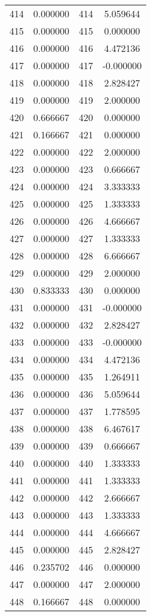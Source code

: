 \documentclass[12pt]{article}
\begin{document}
\begin{longtable}{@{}cccc@{}}
414 & 0.000000 & 414 & 5.059644 \\
415 & 0.000000 & 415 & 0.000000 \\
416 & 0.000000 & 416 & 4.472136 \\
417 & 0.000000 & 417 & -0.000000 \\
418 & 0.000000 & 418 & 2.828427 \\
419 & 0.000000 & 419 & 2.000000 \\
420 & 0.666667 & 420 & 0.000000 \\
421 & 0.166667 & 421 & 0.000000 \\
422 & 0.000000 & 422 & 2.000000 \\
423 & 0.000000 & 423 & 0.666667 \\
424 & 0.000000 & 424 & 3.333333 \\
425 & 0.000000 & 425 & 1.333333 \\
426 & 0.000000 & 426 & 4.666667 \\
427 & 0.000000 & 427 & 1.333333 \\
428 & 0.000000 & 428 & 6.666667 \\
429 & 0.000000 & 429 & 2.000000 \\
430 & 0.833333 & 430 & 0.000000 \\
431 & 0.000000 & 431 & -0.000000 \\
432 & 0.000000 & 432 & 2.828427 \\
433 & 0.000000 & 433 & -0.000000 \\
434 & 0.000000 & 434 & 4.472136 \\
435 & 0.000000 & 435 & 1.264911 \\
436 & 0.000000 & 436 & 5.059644 \\
437 & 0.000000 & 437 & 1.778595 \\
438 & 0.000000 & 438 & 6.467617 \\
439 & 0.000000 & 439 & 0.666667 \\
440 & 0.000000 & 440 & 1.333333 \\
441 & 0.000000 & 441 & 1.333333 \\
442 & 0.000000 & 442 & 2.666667 \\
443 & 0.000000 & 443 & 1.333333 \\
444 & 0.000000 & 444 & 4.666667 \\
445 & 0.000000 & 445 & 2.828427 \\
446 & 0.235702 & 446 & 0.000000 \\
447 & 0.000000 & 447 & 2.000000 \\
448 & 0.166667 & 448 & 0.000000 \\

\end{longtable}
\end{document}
